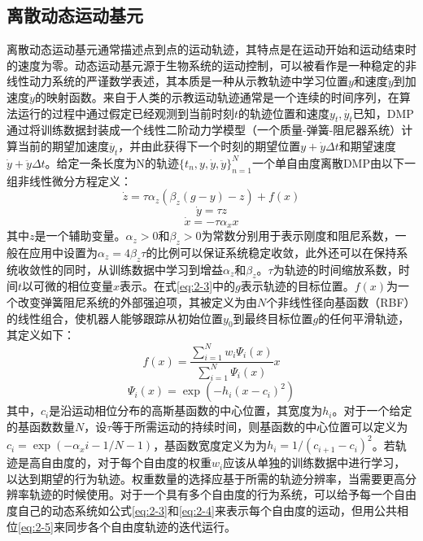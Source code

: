 \subsection{离散动态运动基元}
离散动态运动基元通常描述点到点的运动轨迹，其特点是在运动开始和运动结束时的速度为零。动态运动基元源于生物系统的运动控制，可以被看作是一种稳定的非线性动力系统的严谨数学表述，其本质是一种从示教轨迹中学习位置$y$和速度$\dot{y}$到加速度$\ddot{y}$的映射函数。来自于人类的示教运动轨迹通常是一个连续的时间序列，在算法运行的过程中通过假定已经观测到当前时刻$t$的轨迹位置和速度${y_t,\dot{y_t}}$已知，DMP通过将训练数据封装成一个线性二阶动力学模型（一个质量-弹簧-阻尼器系统）计算当前的期望加速度$\ddot{y_t}$，并由此获得下一个时刻的期望位置$y+\dot{y}\Delta t$和期望速度$\dot{y}+\ddot{y}\Delta t$\cite{HuangJiQiRenYunDongGuiJiDeMoFangXueXiZongShu}。给定一条长度为N的轨迹$\{ t_n,y,\dot{y},\ddot{y} \}_{n=1}^N$一个单自由度离散DMP由以下一组非线性微分方程定义：
\begin{equation}
    \dot{z}=\tau \alpha_z\left(\beta_z(g-y)-z\right)+f(x)
    \label{eq:2-3}
\end{equation}
\begin{equation}
    \dot{y}=\tau z 
    \label{eq:2-4}
\end{equation}
\begin{equation}
    \dot{x}=-\tau \alpha_x x
    \label{eq:2-5}
\end{equation}
其中$z$是一个辅助变量。$α_z>0$和$β_z>0$为常数分别用于表示刚度和阻尼系数，一般在应用中设置为$α_z=4β_z$$\tau$的比例可以保证系统稳定收敛，此外还可以在保持系统收敛性的同时，从训练数据中学习到增益$α_z$和$β_z$\cite{tanApplyingAdaptiveControlb}。$\tau$为轨迹的时间缩放系数，时间$t$以可微的相位变量$x$表示。在式\ref{eq:2-3}中的$g$表示轨迹的目标位置。$f(x)$为一个改变弹簧阻尼系统的外部强迫项，其被定义为由$N$个非线性径向基函数（RBF）的线性组合，使机器人能够跟踪从初始位置$y_0$到最终目标位置$g$的任何平滑轨迹，其定义如下：
\begin{equation}
    f(x)=\frac{\sum_{i=1}^N w_i \Psi_i(x)}{\sum_{i=1}^N \Psi_i(x)} x
    \label{eq:2-6}
\end{equation}
\begin{equation}
    \Psi_i(x)=\exp \left(-h_i\left(x-c_i\right)^2\right)
    \label{eq:2-7}
\end{equation}
其中，$c_i$是沿运动相位分布的高斯基函数的中心位置，其宽度为$h_i$。对于一个给定的基函数数量$N$，设$τ$等于所需运动的持续时间，则基函数的中心位置可以定义为$c_i=\exp \left(-\alpha_x i-1 / N-1\right)$，基函数宽度定义为为$h_i=1 /\left(c_{i+1}-c_i\right)^2$。若轨迹是高自由度的，对于每个自由度的权重$w_i$应该从单独的训练数据中进行学习，以达到期望的行为轨迹。权重数量的选择应基于所需的轨迹分辨率，当需要更高分辨率轨迹的时候使用。对于一个具有多个自由度的行为系统，可以给予每一个自由度自己的动态系统如公式\ref{eq:2-3}和\ref{eq:2-4}来表示每个自由度的运动，但用公共相位\ref{eq:2-5}来同步各个自由度轨迹的迭代运行。

